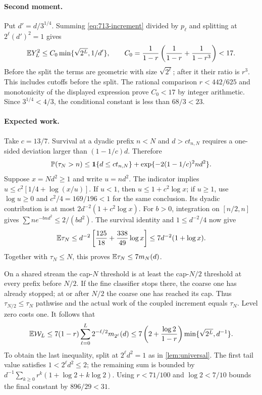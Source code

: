 \paragraph{Second moment.}
Put $d'=d/3^{1/4}$. Summing \eqref{eq:713-increment} divided by
$p_\ell$ and splitting at $2^\ell(d')^2=1$ gives
\[
 \mathbb E Y_L^2\le C_0\min\{\sqrt{2^L},1/d'\},\qquad
 C_0=\frac1{1-r}\left(\frac1{1-r}+\frac1{1-r^3}\right)<17.
\]
Before the split the terms are geometric with size $\sqrt{2^\ell}$;
after it their ratio is $r^3$. This includes cutoffs before the split.
The rational comparison $r<442/625$ and monotonicity of the displayed
expression prove $C_0<17$ by integer arithmetic. Since
$3^{1/4}<4/3$, the conditional constant is less than $68/3<23$.

\paragraph{Expected work.}
Take $c=13/7$. Survival at a dyadic prefix $n<N$ and $d>ct_{n,N}$
requires a one-sided deviation larger than $(1-1/c)d$. Therefore
\[
 \mathbb P(\tau_N>n)\le\mathbf 1\{d\le ct_{n,N}\}
            +\exp\{-2(1-1/c)^2nd^2\}.
\]
Suppose $x=Nd^2\ge1$ and write $u=nd^2$. The indicator implies
$u\le c^2[1/4+\log(x/u)]$. If $u<1$, then
$u\le1+c^2\log x$; if $u\ge1$, use $\log u\ge0$ and
$c^2/4=169/196<1$ for the same conclusion. Its dyadic contribution
is at most $2d^{-2}(1+c^2\log x)$.
For $b>0$, integration on $[n/2,n]$ gives
$\sum n e^{-bnd^2}\le2/(bd^2)$. The survival identity and
$1\le d^{-2}/4$ now give
\[
 \mathbb E\tau_N
 \le d^{-2}\left[\frac{125}{18}+\frac{338}{49}\log x\right]
 \le7d^{-2}(1+\log x).
\]
Together with $\tau_N\le N$, this proves $\mathbb E\tau_N\le7m_N(d)$.

On a shared stream the cap-$N$ threshold is at least the cap-$N/2$
threshold at every prefix before $N/2$. If the fine classifier stops
there, the coarse one has already stopped; at or after $N/2$ the coarse
one has reached its cap. Thus $\tau_{N/2}\le\tau_N$ pathwise and the
actual work of the coupled increment equals $\tau_N$. Level zero
costs one. It follows that
\[
 \mathbb E\mathcal W_L\le7(1-r)\sum_{\ell=0}^L
          2^{-\ell/2}m_{2^\ell}(d)
 \le7\left(2+\frac{\log2}{1-r}\right)
          \min\{\sqrt{2^L},d^{-1}\}.
\]
To obtain the last inequality, split at $2^\ell d^2=1$ as in
\cref{lem:universal}. The first tail value satisfies $1<2^\ell d^2\le2$;
the remaining sum is bounded by
$d^{-1}\sum_{k\ge0}r^k(1+\log2+k\log2)$.
Using $r<71/100$ and $\log2<7/10$ bounds the final constant by
$896/29<31$.

